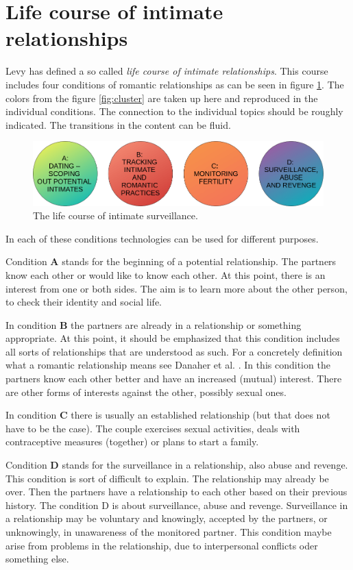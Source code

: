 \section{Life course of intimate relationships}
\label{sec:life_course}
Levy \cite{levy2014intimate} has defined a so called \textit{life course of intimate relationships}. This course includes four conditions of romantic relationships as can be seen in figure \ref{fig:live_course}. The colors from the figure \ref{fig:cluster} are taken up here and reproduced in the individual conditions. The connection to the individual topics should be roughly indicated. The transitions in the content can be fluid.
\begin{figure}[htb]
    \centering
	\includegraphics[width=\linewidth]{img/life_course_of_intimate_surveillance.png}
	\caption{The life course of intimate surveillance.}
	\label{fig:live_course}
\end{figure}

In each of these conditions technologies can be used for different purposes.

Condition \textbf{A} stands for the beginning of a potential relationship. The partners know each other or would like to know each other. At this point, there is an interest from one or both sides. The aim is to learn more about the other person, to check their identity and social life.

In condition \textbf{B} the partners are already in a relationship or something appropriate. At this point, it should be emphasized that this condition includes all sorts of relationships that are understood as such. For a concretely definition what a romantic relationship means see Danaher et al. \cite{doi:10.1080/15265161.2017.1409823}. In this condition the partners know each other better and have an increased (mutual) interest. There are other forms of interests against the other, possibly sexual ones.

In condition \textbf{C} there is usually an established relationship (but that does not have to be the case). The couple exercises sexual activities, deals with contraceptive measures (together) or plans to start a family.

Condition \textbf{D} stands for the surveillance in a relationship, also abuse and revenge. This condition is sort of difficult to explain. 
The relationship may already be over. Then the partners have a relationship to each other based on their previous history. The condition D is about surveillance, abuse and revenge. Surveillance in a relationship may be voluntary and knowingly, accepted by the partners, or unknowingly, in unawareness of the monitored partner.
This condition maybe arise from problems in the relationship, due to interpersonal conflicts oder something else.

